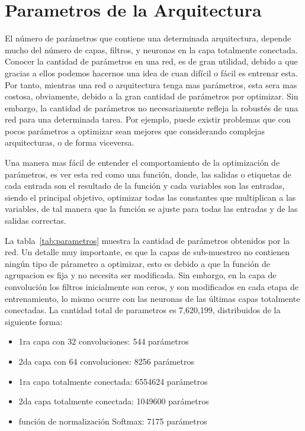 \section{Parametros de la Arquitectura}

El número de parámetros que contiene una determinada arquitectura, depende mucho del número de capas, filtros, y neuronas en la capa totalmente conectada. Conocer la cantidad de parámetros en una red, es de gran utilidad, debido a que gracias a ellos podemos hacernos una idea de cuan difícil o fácil es entrenar esta. Por tanto, mientras una red o arquitectura tenga mas parámetros, esta sera mas costosa, obviamente, debido a la gran cantidad de parámetros por optimizar. Sin embargo, la cantidad de parámetros no necesariamente refleja la robustés de una red para una determinada tarea. Por ejemplo, puede existir problemas que con pocos parámetros a optimizar sean mejores que considerando complejas arquitecturas, o de forma viceversa.

Una manera mas fácil de entender el comportamiento de la optimización de parámetros, es ver esta red como una función, donde, las salidas o etiquetas de cada entrada son el resultado de la función y cada variables son las entradas, siendo el principal objetivo, optimizar todas las constantes que multiplican a las variables, de tal manera que la función se ajuste para todas las entradas y de las salidas correctas. 

La tabla~\ref{tab:parametros} muestra la cantidad de parámetros obtenidos por la red. Un detalle muy importante, es que la capas de sub-muestreo no contienen ningún tipo de párametro a optimizar, esto es debido a que la función de agrupacion es fija y no necesita ser modificada. Sin embargo, en la capa de convolución los filtros inicialmente son ceros, y son modificados en cada etapa de entrenamiento, lo mismo ocurre con las neuronas de las últimas capas totalmente conectadas. La cantidad total de parametros es 7,620,199, distribuidos de la siguiente forma: 

\begin{itemize}
\item 1ra capa con 32 convoluciones: 544 parámetros
\item 2da capa con 64 convoluciones: 8256 parámetros
\item 1ra capa totalmente conectada: 6554624 parámetros
\item 2da capa totalmente conectada: 1049600 parámetros
\item función de normalización Softmax: 7175 parámetros
\end{itemize}

